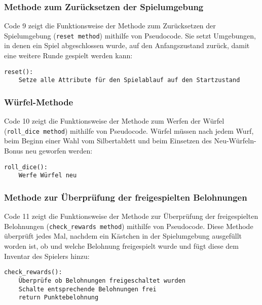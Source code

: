 \subsubsection{Methode zum Zurücksetzen der Spielumgebung}
\begin{minipage}{\linewidth}
Code 9 zeigt die Funktionsweise der Methode zum Zurücksetzen der Spielumgebung (\texttt{reset method}) mithilfe von Pseudocode. Sie setzt Umgebungen, in denen ein Spiel abgeschlossen wurde, auf den Anfangszustand zurück, damit eine weitere Runde gespielt werden kann:
\vspace{0.5cm}
\begin{lstlisting}[caption={Methode zum Zurücksetzen der Umgebung}]
reset():
	Setze alle Attribute für den Spielablauf auf den Startzustand
\end{lstlisting}
\end{minipage}

\subsubsection{Würfel-Methode}
\begin{minipage}{\linewidth}
Code 10 zeigt die Funktionsweise der Methode zum Werfen der Würfel (\texttt{roll\_dice method}) mithilfe von Pseudocode. Würfel müssen nach jedem Wurf, beim Beginn einer Wahl vom Silbertablett und beim Einsetzen des Neu-Würfeln-Bonus neu geworfen werden:
\vspace{0.5cm}
\begin{lstlisting}[caption={Methode zum Werfen der Würfel}]
roll_dice():
	Werfe Würfel neu
\end{lstlisting}
\end{minipage}

\subsubsection{Methode zur Überprüfung der freigespielten Belohnungen}
\begin{minipage}{\linewidth}
Code 11 zeigt die Funktionsweise der Methode zur Überprüfung der freigespielten Belohnungen (\texttt{check\_rewards method}) mithilfe von Pseudocode. Diese Methode überprüft jedes Mal, nachdem ein Kästchen in der Spielumgebung ausgefüllt worden ist, ob und welche Belohnung freigespielt wurde und fügt diese dem Inventar des Spielers hinzu:
\vspace{0.5cm}
\begin{lstlisting}[caption={Methode zur Überprüfung der freigespielten Belohnungen}]
check_rewards():
	Überprüfe ob Belohnungen freigeschaltet wurden
	Schalte entsprechende Belohnungen frei
	return Punktebelohnung
\end{lstlisting}
\end{minipage}
